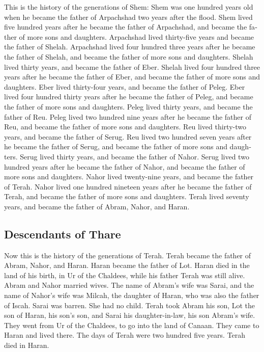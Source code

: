 \begin{paracol}{2}
\begin{otherlanguage}{english}
 This is the history of the generations of Shem: Shem was
one hundred years old when he became the father of Arpachshad two years
after the flood.  Shem lived five hundred years after he
became the father of Arpachshad, and became the father of more sons and
daughters.  Arpachshad lived thirty-five years and became
the father of Shelah.  Arpachshad lived four hundred
three years after he became the father of Shelah, and became the father
of more sons and daughters.  Shelah lived thirty years,
and became the father of Eber.  Shelah lived four hundred
three years after he became the father of Eber, and became the father of
more sons and daughters.  Eber lived thirty-four years,
and became the father of Peleg.  Eber lived four hundred
thirty years after he became the father of Peleg, and became the father
of more sons and daughters.  Peleg lived thirty years,
and became the father of Reu.  Peleg lived two hundred
nine years after he became the father of Reu, and became the father of
more sons and daughters.  Reu lived thirty-two years, and
became the father of Serug.  Reu lived two hundred seven
years after he became the father of Serug, and became the father of more
sons and daughters.  Serug lived thirty years, and became
the father of Nahor.  Serug lived two hundred years after
he became the father of Nahor, and became the father of more sons and
daughters.  Nahor lived twenty-nine years, and became the
father of Terah.  Nahor lived one hundred nineteen years
after he became the father of Terah, and became the father of more sons
and daughters.  Terah lived seventy years, and became the
father of Abram, Nahor, and Haran.

\hypertarget{descendants-of-thare}{%
\subsection{Descendants of Thare}\label{descendants-of-thare}}

 Now this is the history of the generations of Terah.
Terah became the father of Abram, Nahor, and Haran. Haran became the
father of Lot.  Haran died in the land of his birth, in
Ur of the Chaldees, while his father Terah was still alive.
 Abram and Nahor married wives. The name of Abram's wife
was Sarai, and the name of Nahor's wife was Milcah, the daughter of
Haran, who was also the father of Iscah.  Sarai was
barren. She had no child.  Terah took Abram his son, Lot
the son of Haran, his son's son, and Sarai his daughter-in-law, his son
Abram's wife. They went from Ur of the Chaldees, to go into the land of
Canaan. They came to Haran and lived there.  The days of
Terah were two hundred five years. Terah died in Haran.


\end{otherlanguage}
\end{paracol}
